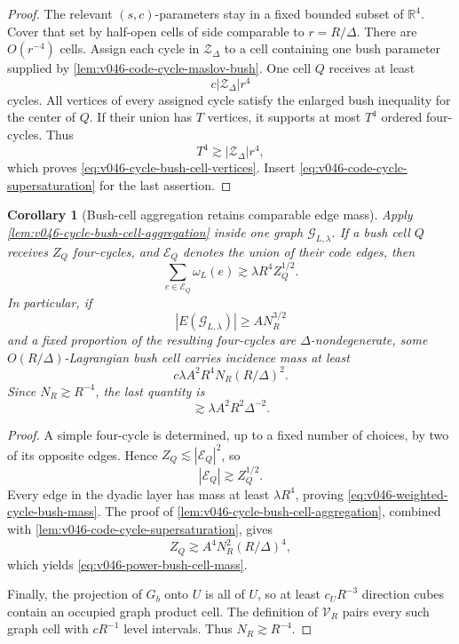 \documentclass[10pt]{article}
\newtheorem{corollary}[theorem]{Corollary}
\newcommand{\R}{\mathbb R}
\begin{document}
\begin{proof}
The relevant \((s,c)\)-parameters stay in a fixed bounded subset of \(\R^4\).  Cover that set by
half-open cells of side comparable to \(r=R/\Delta\).  There are \(O(r^{-4})\) cells.  Assign each
cycle in \(\mathcal Z_\Delta\) to a cell containing one bush parameter supplied by
\cref{lem:v046-code-cycle-maslov-bush}.  One cell \(Q\) receives at least
\[
c|\mathcal Z_\Delta|r^4
\]
cycles.  All vertices of every assigned cycle satisfy the enlarged bush inequality for the center
of \(Q\).  If their union has \(T\) vertices, it supports at most \(T^4\) ordered four-cycles.
Thus
\[
T^4\gtrsim|\mathcal Z_\Delta|r^4,
\]
which proves \eqref{eq:v046-cycle-bush-cell-vertices}.  Insert
\eqref{eq:v046-code-cycle-supersaturation} for the last assertion.
\end{proof}

\begin{corollary}[Bush-cell aggregation retains comparable edge mass]
\label{cor:v046-weighted-cycle-bush-cell}
Apply \cref{lem:v046-cycle-bush-cell-aggregation} inside one graph
\(\mathscr G_{L,\lambda}\).  If a bush cell \(Q\) receives \(Z_Q\) four-cycles, and
\(\mathscr E_Q\) denotes the union of their code edges, then
\begin{equation}
\label{eq:v046-weighted-cycle-bush-mass}
\boxed{
\sum_{e\in\mathscr E_Q}\omega_L(e)
\gtrsim
\lambda R^4 Z_Q^{1/2}.
}
\end{equation}
In particular, if
\[
|E(\mathscr G_{L,\lambda})|
\ge A N_R^{3/2}
\]
and a fixed proportion of the resulting four-cycles are \(\Delta\)-nondegenerate, some
\(O(R/\Delta)\)-Lagrangian bush cell carries incidence mass at least
\begin{equation}
\label{eq:v046-power-bush-cell-mass}
\boxed{
c\lambda A^2R^4N_R(R/\Delta)^2.
}
\end{equation}
Since \(N_R\gtrsim R^{-4}\), the last quantity is
\[
\gtrsim \lambda A^2R^2\Delta^{-2}.
\]
\end{corollary}

\begin{proof}
A simple four-cycle is determined, up to a fixed number of choices, by two of its opposite edges.
Hence \(Z_Q\lesssim|\mathscr E_Q|^2\), so
\[
|\mathscr E_Q|\gtrsim Z_Q^{1/2}.
\]
Every edge in the dyadic layer has mass at least \(\lambda R^4\), proving
\eqref{eq:v046-weighted-cycle-bush-mass}.  The proof of
\cref{lem:v046-cycle-bush-cell-aggregation}, combined with
\cref{lem:v046-code-cycle-supersaturation}, gives
\[
Z_Q\gtrsim A^4N_R^2(R/\Delta)^4,
\]
which yields \eqref{eq:v046-power-bush-cell-mass}.

Finally, the projection of \(G_b\) onto \(U\) is all of \(U\), so at least \(c_UR^{-3}\)
direction cubes contain an occupied graph product cell.  The definition of \(\mathscr V_R\)
pairs every such graph cell with \(cR^{-1}\) level intervals.  Thus \(N_R\gtrsim R^{-4}\).
\end{proof}
\end{document}
